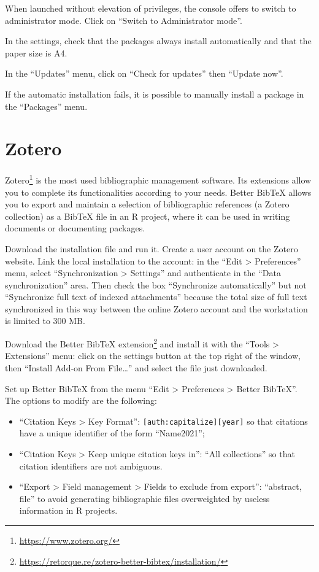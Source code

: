 \documentclass[
  12pt,
  american,
  a4paper,
  extrafontsizes,onecolumn,openright
  ]{memoir}
\providecommand{\tightlist}{%
  \setlength{\itemsep}{0pt}\setlength{\parskip}{0pt}}
\begin{document}
When launched without elevation of privileges, the console offers to switch to administrator mode.
Click on \enquote{Switch to Administrator mode}.

In the settings, check that the packages always install automatically and that the paper size is A4.

In the \enquote{Updates} menu, click on \enquote{Check for updates} then \enquote{Update now}.

If the automatic installation fails, it is possible to manually install a package in the \enquote{Packages} menu.

\hypertarget{sec:Zotero}{%
\section{Zotero}\label{sec:Zotero}}

Zotero\footnote{\url{https://www.zotero.org/}} is the most used bibliographic management software.
Its extensions allow you to complete its functionalities according to your needs.
Better BibTeX allows you to export and maintain a selection of bibliographic references (a Zotero collection) as a BibTeX file in an R project, where it can be used in writing documents or documenting packages.

Download the installation file and run it.
Create a user account on the Zotero website.
Link the local installation to the account: in the \enquote{Edit \textgreater{} Preferences} menu, select \enquote{Synchronization \textgreater{} Settings} and authenticate in the \enquote{Data synchronization} area.
Then check the box \enquote{Synchronize automatically} but not \enquote{Synchronize full text of indexed attachments} because the total size of full text synchronized in this way between the online Zotero account and the workstation is limited to 300 MB.

Download the Better BibTeX extension\footnote{\url{https://retorque.re/zotero-better-bibtex/installation/}} and install it with the \enquote{Tools \textgreater{} Extensions} menu: click on the settings button at the top right of the window, then \enquote{Install Add-on From File\ldots{}} and select the file just downloaded.

Set up Better BibTeX from the menu \enquote{Edit \textgreater{} Preferences \textgreater{} Better BibTeX}.
The options to modify are the following:

\begin{itemize}
\tightlist
\item
  \enquote{Citation Keys \textgreater{} Key Format}: \texttt{{[}auth:capitalize{]}{[}year{]}} so that citations have a unique identifier of the form \enquote{Name2021};
\item
  \enquote{Citation Keys \textgreater{} Keep unique citation keys in}: \enquote{All collections} so that citation identifiers are not ambiguous.
\item
  \enquote{Export \textgreater{} Field management \textgreater{} Fields to exclude from export}: \enquote{abstract, file} to avoid generating bibliographic files overweighted by useless information in R projects.
\end{itemize}
\end{document}
